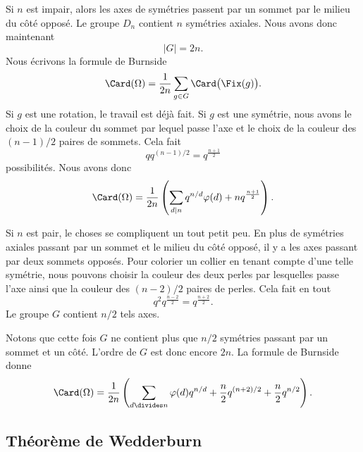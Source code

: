 Si \( n\) est impair, alors les axes de symétries passent par un sommet par le milieu du côté opposé. Le groupe \( D_n\) contient \( n\) symétries axiales. Nous avons donc maintenant
\begin{equation}
    | G |=2n.
\end{equation}
Nous écrivons la formule de Burnside
\begin{equation}
    \Card(\Omega)=\frac{1}{ 2n }\sum_{g\in G}\Card\big( \Fix(g) \big).
\end{equation}
Si \( g\) est une rotation, le travail est déjà fait. Si \( g\) est une symétrie, nous avons le choix de la couleur du sommet par lequel passe l'axe et le choix de la couleur des \( (n-1)/2\) paires de sommets. Cela fait
\begin{equation}
    qq^{(n-1)/2}=q^{\frac{ n+1 }{2}}
\end{equation}
possibilités. Nous avons donc
\begin{equation}
    \Card(\Omega)=\frac{1}{ 2n }\left( \sum_{d|n}q^{n/d}\varphi(d)+nq^{\frac{ n+1 }{2}} \right).
\end{equation}

Si \( n\) est pair, le choses se compliquent un tout petit peu. En plus de symétries axiales passant par un sommet et le milieu du côté opposé, il y a les axes passant par deux sommets opposés. Pour colorier un collier en tenant compte d'une telle symétrie, nous pouvons choisir la couleur des deux perles par lesquelles passe l'axe ainsi que la couleur des \( (n-2)/2\) paires de perles. Cela fait en tout
\begin{equation}
    q^2q^{\frac{ n-2 }{2}}=q^{\frac{ n+2 }{2}}.
\end{equation}
Le groupe \( G\) contient \( n/2\) tels axes.

Notons que cette fois \( G\) ne contient plus que \( n/2\) symétries passant par un sommet et un côté. L'ordre de $G$ est donc encore \( 2n\). La formule de Burnside donne
\begin{equation}
    \Card(\Omega)=\frac{1}{ 2n }\left( \sum_{d\divides n}\varphi(d)q^{n/d}+\frac{ n }{2}q^{(n+2)/2}+\frac{ n }{2}q^{n/2} \right).
\end{equation}

\subsection{Théorème de Wedderburn}


